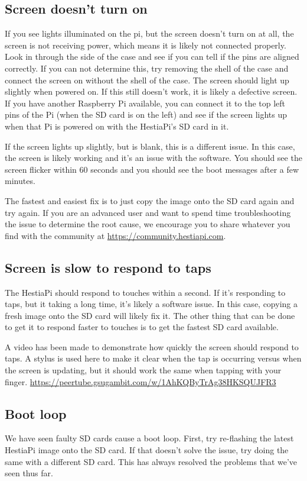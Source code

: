 \subsection{Screen doesn't turn on}
If you see lights illuminated on the pi, but the screen doesn't turn on at all,
the screen is not receiving power, which means it is likely not connected
properly. Look in through the side of the case and see if you can tell if the
pins are aligned correctly. If you can not determine this, try removing the
shell of the case and connect the screen on without the shell of the case. The
screen should light up slightly when powered on. If this still doesn't work, it
is likely a defective screen. If you have another Raspberry Pi available, you
can connect it to the top left pins of the Pi (when the SD card is on the left)
and see if the screen lights up when that Pi is powered on with the HestiaPi's
SD card in it.

If the screen lights up slightly, but is blank, this is a different issue. In
this case, the screen is likely working and it's an issue with the software.
You should see the screen flicker within 60 seconds and you should see the
boot messages after a few minutes.

The fastest and easiest fix is to just copy the image onto the SD card again
and try again. If you are an advanced user and want to spend time
troubleshooting the issue to determine the root cause, we encourage you to
share whatever you find with the community at
\url{https://community.hestiapi.com}.

\subsection{Screen is slow to respond to taps}
The HestiaPi should respond to touches within a second. If it's responding
to taps, but it taking a long time, it's likely a software issue. In this
case, copying a fresh image onto the SD card will likely fix it. The other
thing that can be done to get it to respond faster to touches is to get the
fastest SD card available.

A video has been made to demonstrate how quickly the screen should respond to
taps. A stylus is used here to make it clear when the tap is occurring versus
when the screen is updating, but it should work the same when tapping with your
finger. \url{https://peertube.gsugambit.com/w/1AhKQByTrAg38HKSQUJFR3}

\subsection{Boot loop}
We have seen faulty SD cards cause a boot loop. First, try re-flashing the
latest HestiaPi image onto the SD card. If that doesn't solve the issue,
try doing the same with a different SD card. This has always resolved the
problems that we've seen thus far.

